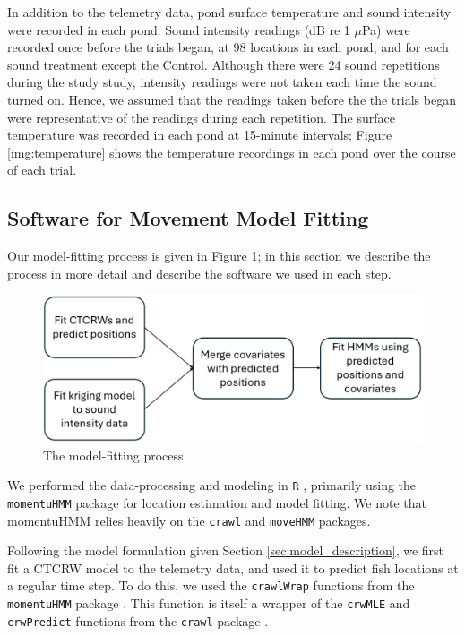 \documentclass[12pt]{article}
\begin{document}
	In addition to the telemetry data, pond surface temperature and sound intensity were recorded in each pond. 	
	Sound intensity readings (dB re 1 $\mu$Pa) were recorded once before the trials began, at 98 locations in each pond, and for each sound treatment except the Control. Although there were 24 sound repetitions during the study study, intensity readings were not taken each time the sound turned on. Hence, we assumed that the readings taken before the the trials began were representative of the readings during each repetition. The surface temperature was recorded in each pond at 15-minute intervals; Figure \ref{img:temperature} shows the temperature recordings in each pond over the course of each trial.		
	
	\subsection{Software for Movement Model Fitting}
	
	Our model-fitting process is given in Figure \ref{img:flowchart}; in this section we describe the process in more detail and describe the software we used in each step.
	
	\begin{figure}
		\includegraphics[width=\textwidth]{flowchart.png}
		\caption{The model-fitting process.}
		\label{img:flowchart}
	\end{figure}
	
	We performed the data-processing and modeling in \texttt{R} \cite{Rlang2022}, primarily using the \texttt{momentuHMM} package \cite{McClintock2018} for location estimation and model fitting. We note that momentuHMM relies heavily on the \texttt{crawl} \cite{crawl} and \texttt{moveHMM} \cite{Michelot2016} packages.
	
	Following the model formulation given Section \ref{sec:model_description}, we first fit a CTCRW model to the telemetry data, and used it to predict fish locations at a regular time step. To do this, we used the \texttt{crawlWrap} functions from the \texttt{momentuHMM} package \cite{McClintock2018}. This function is itself a wrapper of the \texttt{crwMLE} and \texttt{crwPredict} functions from the \texttt{crawl} package \cite{crawl}.
	
\end{document}

